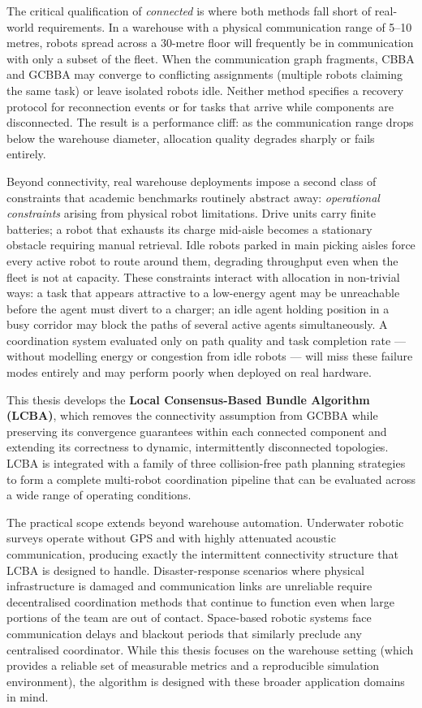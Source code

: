 The critical qualification of \emph{connected} is where both methods fall
short of real-world requirements.
In a warehouse with a physical communication range of 5--10 metres,
robots spread across a 30-metre floor will frequently be in communication with
only a subset of the fleet.
When the communication graph fragments, CBBA and GCBBA may converge to
conflicting assignments (multiple robots claiming the same task) or leave
isolated robots idle.
Neither method specifies a recovery protocol for reconnection events or for
tasks that arrive while components are disconnected.
The result is a performance cliff: as the communication range drops below
the warehouse diameter, allocation quality degrades sharply or fails entirely.

Beyond connectivity, real warehouse deployments impose a second class of
constraints that academic benchmarks routinely abstract away:
\emph{operational constraints} arising from physical robot limitations.
Drive units carry finite batteries; a robot that exhausts its charge
mid-aisle becomes a stationary obstacle requiring manual retrieval.
Idle robots parked in main picking aisles force every active robot to
route around them, degrading throughput even when the fleet is not at
capacity.
These constraints interact with allocation in non-trivial ways: a task that
appears attractive to a low-energy agent may be unreachable before the
agent must divert to a charger; an idle agent holding position in a busy
corridor may block the paths of several active agents simultaneously.
A coordination system evaluated only on path quality and task completion
rate --- without modelling energy or congestion from idle robots --- will
miss these failure modes entirely and may perform poorly when deployed
on real hardware.

This thesis develops the \textbf{Local Consensus-Based Bundle Algorithm
(LCBA)}, which removes the connectivity assumption from GCBBA while preserving
its convergence guarantees within each connected component and extending
its correctness to dynamic, intermittently disconnected topologies.
LCBA is integrated with a family of three collision-free path planning strategies
to form a complete multi-robot coordination pipeline that can be evaluated
across a wide range of operating conditions.

The practical scope extends beyond warehouse automation.
Underwater robotic surveys operate without GPS and with highly attenuated
acoustic communication, producing exactly the intermittent connectivity
structure that LCBA is designed to handle.
Disaster-response scenarios where physical infrastructure is damaged and
communication links are unreliable require decentralised coordination
methods that continue to function even when large portions of the team are
out of contact.
Space-based robotic systems face communication delays and blackout periods
that similarly preclude any centralised coordinator.
While this thesis focuses on the warehouse setting (which provides a reliable
set of measurable metrics and a reproducible simulation environment), the
algorithm is designed with these broader application domains in mind.


